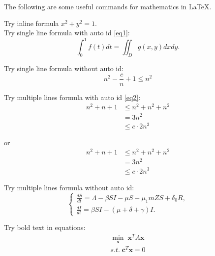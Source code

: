 \documentclass{homework}
\begin{document}
%
%
\begin{homeworkProblem}
    The following are some useful commands for mathematics in \LaTeX.

    \solution

    Try inline formula $x^2+y^2=1$. \\
    
    Try single line formula with auto id \ref{eq1}:
    \begin{equation}\label{eq1}
        \int_0^1f(t)dt = \iint_Dg(x,y)dxdy.
    \end{equation}

    Try single line formula without auto id:
    \begin{equation*}
        n^2 - \dfrac{c}{n} + 1 \leq n^2
    \end{equation*}

    Try multiple lines formula with auto id \ref{eq2}:
    \begin{equation}\label{eq2}
        \begin{split}
            n^2 + n + 1 &\leq n^2 + n^2 + n^2 \\
            &= 3n^2 \\
            &\leq c \cdot 2n^3
        \end{split}
    \end{equation}

    or
    \begin{align}
        n^2 + n + 1 &\leq n^2 + n^2 + n^2 \\
        &= 3n^2 \\
        &\leq c \cdot 2n^3
    \end{align}

    Try multiple lines formula without auto id:
    \begin{equation*}
        \begin{cases}
            \frac{dS}{dt} = \Lambda - \beta SI - \mu S -\mu_1 mZS + \delta_0R, \\
            \frac{dI}{dt} = \beta SI - (\mu+\delta+\gamma)I.
        \end{cases}
    \end{equation*}

    Try bold text in equations:
    \begin{align*}
        \min_{\bm{x}} \; \bm{x}^T A \bm{x} \\
        s.t. \; \bm{c}^T \bm{x} = 0
    \end{align*}
    
\end{homeworkProblem}
\end{document}
